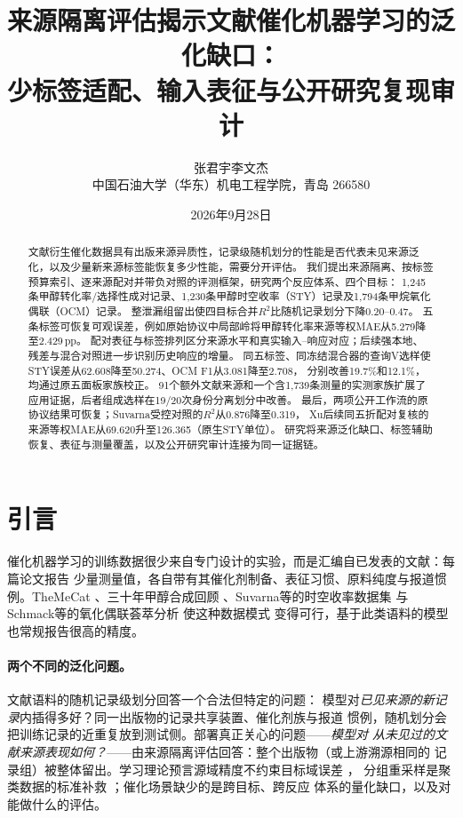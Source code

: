 \documentclass[11pt,a4paper]{article}
\title{\textbf{来源隔离评估揭示文献催化机器学习的泛化缺口：\\
少标签适配、输入表征与公开研究复现审计}}
\author{张君宇\quad 李文杰\\[2pt]
\small 中国石油大学（华东）机电工程学院，青岛 266580}
\date{2026年9月28日}
\newcommand{\pp}{\,pp}
\begin{document}
\maketitle

\begin{abstract}
\noindent
文献衍生催化数据具有出版来源异质性，记录级随机划分的性能是否代表未见来源泛化，以及少量新来源标签能恢复多少性能，需要分开评估。
我们提出来源隔离、按标签预算索引、逐来源配对并带负对照的评测框架，研究两个反应体系、四个目标：
1,245条甲醇转化率/选择性成对记录、1,230条甲醇时空收率（STY）记录及1,794条甲烷氧化偶联（OCM）记录。
整泄漏组留出使四目标合并$R^2$比随机记录划分下降0.20--0.47。
五条标签可恢复可观误差，例如原始协议中局部岭将甲醇转化率来源等权MAE从5.279降至2.429\pp{}。
配对表征与标签排列区分来源水平和真实输入--响应对应；后续强本地、残差与混合对照进一步识别历史响应的增量。
同五标签、同冻结混合器的查询V选样使STY误差从62.608降至50.274、OCM F1从3.081降至2.708，
分别改善19.7\%和12.1\%，均通过原五面板家族校正。
91个额外文献来源和一个含1,739条测量的实测家族扩展了应用证据，后者组成选样在19/20次身份分离划分中改善。
最后，两项公开工作流的原协议结果可恢复；Suvarna受控对照的$R^2$从0.876降至0.319，
Xu后续同五折配对复核的来源等权MAE从69.620升至126.365（原生STY单位）。
研究将来源泛化缺口、标签辅助恢复、表征与测量覆盖，以及公开研究审计连接为同一证据链。
\end{abstract}

\section{引言}
催化机器学习的训练数据很少来自专门设计的实验，而是汇编自已发表的文献：每篇论文报告
少量测量值，各自带有其催化剂制备、表征习惯、原料纯度与报道惯例。TheMeCat
\cite{toldy}、三十年甲醇合成回顾 \cite{yan}、Suvarna等的时空收率数据集
\cite{suvarna} 与Schmack等的氧化偶联荟萃分析 \cite{schmack} 使这种数据模式
变得可行，基于此类语料的模型也常规报告很高的精度。

\paragraph{两个不同的泛化问题。}文献语料的随机记录级划分回答一个合法但特定的问题：
模型对\emph{已见来源的新记录}内插得多好？同一出版物的记录共享装置、催化剂族与报道
惯例，随机划分会把训练记录的近重复放到测试侧。部署真正关心的问题——\emph{模型对
从未见过的文献来源表现如何？}——由来源隔离评估回答：整个出版物（或上游溯源相同的
记录组）被整体留出。学习理论预言源域精度不约束目标域误差 \cite{bendavid}，
分组重采样是聚类数据的标准补救 \cite{roberts}；催化场景缺少的是跨目标、跨反应
体系的量化缺口，以及对能做什么的评估。
\end{document}
